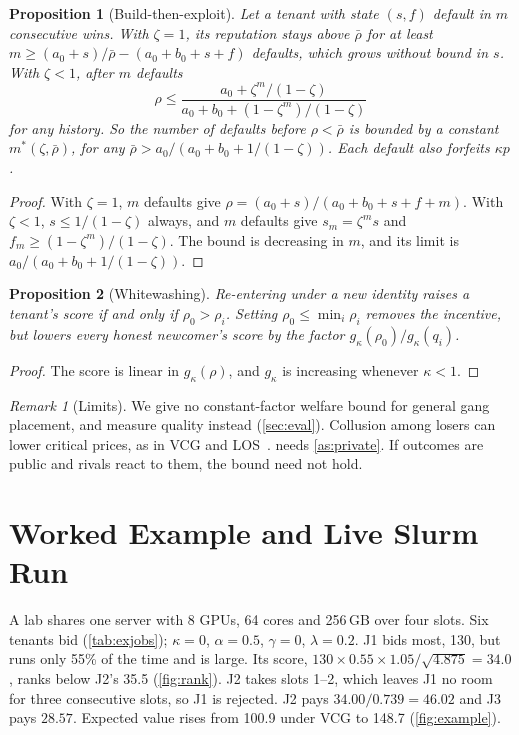 \documentclass[journal]{IEEEtran}
\newtheorem{proposition}{Proposition}
\theoremstyle{remark}
\newtheorem{remark}{Remark}
\begin{document}
\begin{proposition}[Build-then-exploit]\label{prop:exploit}
Let a tenant with state $(s,f)$ default in $m$ consecutive wins. With $\zeta=1$, its reputation stays above $\bar\rho$ for at least $m\ge(a_0+s)/\bar\rho-(a_0+b_0+s+f)$ defaults, which grows without bound in $s$. With $\zeta<1$, after $m$ defaults
\begin{equation}
\rho\le\frac{a_0+\zeta^m/(1-\zeta)}{a_0+b_0+(1-\zeta^m)/(1-\zeta)}
\end{equation}
for any history. So the number of defaults before $\rho<\bar\rho$ is bounded by a constant $m^*(\zeta,\bar\rho)$, for any $\bar\rho>a_0/(a_0+b_0+1/(1-\zeta))$. Each default also forfeits $\kappa p$.
\end{proposition}
\begin{proof}
With $\zeta=1$, $m$ defaults give $\rho=(a_0+s)/(a_0+b_0+s+f+m)$. With $\zeta<1$, $s\le1/(1-\zeta)$ always, and $m$ defaults give $s_m=\zeta^ms$ and $f_m\ge(1-\zeta^m)/(1-\zeta)$. The bound is decreasing in $m$, and its limit is $a_0/(a_0+b_0+1/(1-\zeta))$.
\end{proof}

\begin{proposition}[Whitewashing]\label{prop:white}
Re-entering under a new identity raises a tenant's score if and only if $\rho_0>\rho_i$. Setting $\rho_0\le\min_i\rho_i$ removes the incentive, but lowers every honest newcomer's score by the factor $g_\kappa(\rho_0)/g_\kappa(q_i)$.
\end{proposition}
\begin{proof}
The score is linear in $g_\kappa(\rho)$, and $g_\kappa$ is increasing whenever $\kappa<1$.
\end{proof}

\begin{remark}[Limits]
We give no constant-factor welfare bound for general gang placement, and measure quality instead (\cref{sec:eval}). Collusion among losers can lower critical prices, as in VCG and LOS~\cite{rothkopf2007}.  needs \cref{as:private}. If outcomes are public and rivals react to them, the bound need not hold.
\end{remark}

\section{Worked Example and Live Slurm Run}\label{sec:example}
A lab shares one server with 8 GPUs, 64 cores and 256\,GB over four slots. Six tenants bid (\cref{tab:exjobs}); $\kappa=0$, $\alpha=0.5$, $\gamma=0$, $\lambda=0.2$. J1 bids most, 130, but runs only 55\% of the time and is large. Its score, $130\times0.55\times1.05/\sqrt{4.875}=34.0$, ranks below J2's 35.5 (\cref{fig:rank}). J2 takes slots 1--2, which leaves J1 no room for three consecutive slots, so J1 is rejected. J2 pays $34.00/0.739=46.02$ and J3 pays $28.57$. Expected value rises from 100.9 under VCG to 148.7 (\cref{fig:example}).
\end{document}
